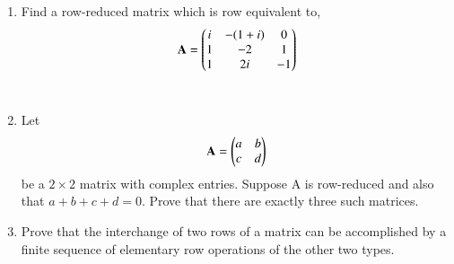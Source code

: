 \renewcommand{\theequation}{\theenumi}
\renewcommand{\thefigure}{\theenumi}
\begin{enumerate}[label=\thesubsection.\arabic*.,ref=\thesubsection.\theenumi]
%
\item Find a row-reduced matrix which is row equivalent to,
\begin{align}
\mathbf{A} = \begin{pmatrix}i&-(1+i)&0\\1&-2&1\\1&2i&-1\end{pmatrix}
\label{eq:solutions/1/2/4/A}
\end{align}
\\
\solution

\item Let
\begin{align}
    \mathbf{A}=\begin{pmatrix}a & b\\c & d\end{pmatrix}
\end{align}
be a $2\times2$ matrix with complex entries. Suppose A is row-reduced and also that $a+b+c+d=0$. Prove that there are exactly three such matrices. 
\\
\solution

\item Prove that the interchange of two rows of a matrix can be accomplished by a finite sequence of elementary row operations of the other two types.
\\
\solution

%
\end{enumerate}


